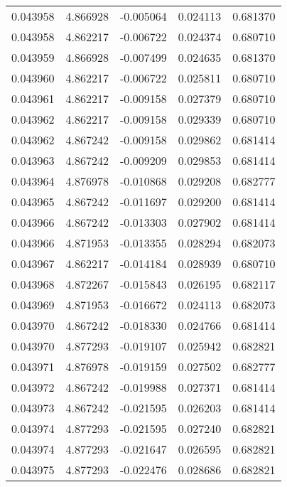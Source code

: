 \begin{tabular}{lrrrr}
0.043958    &  4.866928 & -0.005064 &  0.024113 &             0.681370 \\
0.043958    &  4.862217 & -0.006722 &  0.024374 &             0.680710 \\
0.043959    &  4.866928 & -0.007499 &  0.024635 &             0.681370 \\
0.043960    &  4.862217 & -0.006722 &  0.025811 &             0.680710 \\
0.043961    &  4.862217 & -0.009158 &  0.027379 &             0.680710 \\
0.043962    &  4.862217 & -0.009158 &  0.029339 &             0.680710 \\
0.043962    &  4.867242 & -0.009158 &  0.029862 &             0.681414 \\
0.043963    &  4.867242 & -0.009209 &  0.029853 &             0.681414 \\
0.043964    &  4.876978 & -0.010868 &  0.029208 &             0.682777 \\
0.043965    &  4.867242 & -0.011697 &  0.029200 &             0.681414 \\
0.043966    &  4.867242 & -0.013303 &  0.027902 &             0.681414 \\
0.043966    &  4.871953 & -0.013355 &  0.028294 &             0.682073 \\
0.043967    &  4.862217 & -0.014184 &  0.028939 &             0.680710 \\
0.043968    &  4.872267 & -0.015843 &  0.026195 &             0.682117 \\
0.043969    &  4.871953 & -0.016672 &  0.024113 &             0.682073 \\
0.043970    &  4.867242 & -0.018330 &  0.024766 &             0.681414 \\
0.043970    &  4.877293 & -0.019107 &  0.025942 &             0.682821 \\
0.043971    &  4.876978 & -0.019159 &  0.027502 &             0.682777 \\
0.043972    &  4.867242 & -0.019988 &  0.027371 &             0.681414 \\
0.043973    &  4.867242 & -0.021595 &  0.026203 &             0.681414 \\
0.043974    &  4.877293 & -0.021595 &  0.027240 &             0.682821 \\
0.043974    &  4.877293 & -0.021647 &  0.026595 &             0.682821 \\
0.043975    &  4.877293 & -0.022476 &  0.028686 &             0.682821 \\

\end{tabular}
